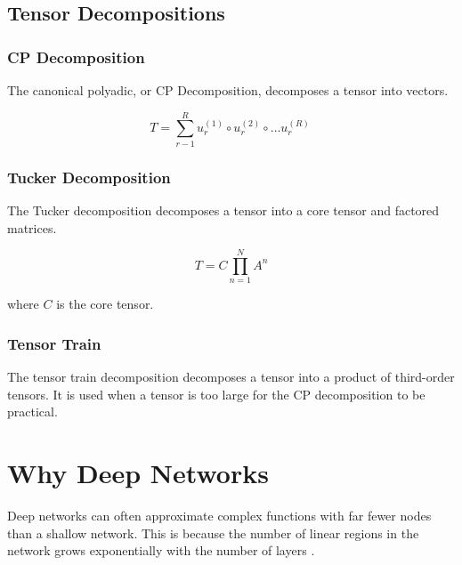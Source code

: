 \documentclass{article}
\begin{document}
\subsection{Tensor Decompositions}


\subsubsection{CP Decomposition}

The canonical polyadic, or CP Decomposition, decomposes a tensor into vectors.

\begin{equation}
    T = \sum_{r-1}^R u_r^{(1)} \circ  u_r^{(2)} \circ \dots  u_r^{(R)}\
    \label{CP}
\end{equation} %


\subsubsection{Tucker Decomposition}

The Tucker decomposition decomposes a tensor into a core tensor and factored matrices. %

\begin{equation}
    T = C\prod_{n=1}^N A^n
    \label{Tucker}
\end{equation} %

where \(C\) is the core tensor.


\subsubsection{Tensor Train}

The tensor train decomposition decomposes a tensor into a product of third-order tensors. It is used when a tensor is too large for the CP decomposition to be practical. 



\section{Why Deep Networks} %

Deep networks can often approximate complex functions with far fewer nodes than a shallow network. This is because the number of linear regions in the network grows exponentially with the number of layers \cite{montufar2014}.
\end{document}
